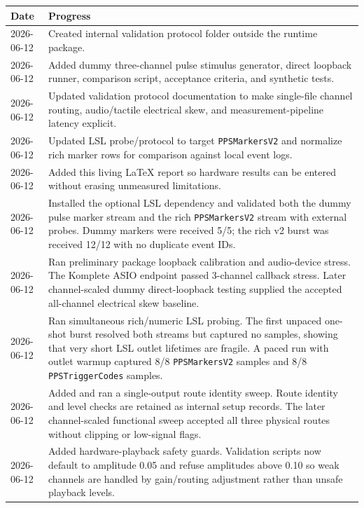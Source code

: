 \documentclass[11pt]{article}
\begin{document}
\begin{longtable}{|p{}|p{}|}
\hline
\textbf{Date} & \textbf{Progress} \\
\hline
2026-06-12 & Created internal validation protocol folder outside the runtime
package. \\
\hline
2026-06-12 & Added dummy three-channel pulse stimulus generator, direct
loopback runner, comparison script, acceptance criteria, and synthetic tests. \\
\hline
2026-06-12 & Updated validation protocol documentation to make single-file
channel routing, audio/tactile electrical skew, and measurement-pipeline
latency explicit. \\
\hline
2026-06-12 & Updated LSL probe/protocol to target \texttt{PPSMarkersV2} and
normalize rich marker rows for comparison against local event logs. \\
\hline
2026-06-12 & Added this living LaTeX report so hardware results can be entered
without erasing unmeasured limitations. \\
\hline
2026-06-12 & Installed the optional LSL dependency and validated both the dummy
pulse marker stream and the rich \texttt{PPSMarkersV2} stream with external
probes. Dummy markers were received 5/5; the rich v2 burst was received 12/12
with no duplicate event IDs. \\
\hline
2026-06-12 & Ran preliminary package loopback calibration and audio-device
stress. The Komplete ASIO endpoint passed 3-channel callback stress. Later
channel-scaled dummy direct-loopback testing supplied the accepted all-channel
electrical skew baseline. \\
\hline
2026-06-12 & Ran simultaneous rich/numeric LSL probing. The first unpaced
one-shot burst resolved both streams but captured no samples, showing that very
short LSL outlet lifetimes are fragile. A paced run with outlet warmup captured
8/8 \texttt{PPSMarkersV2} samples and 8/8 \texttt{PPSTriggerCodes} samples. \\
\hline
2026-06-12 & Added and ran a single-output route identity sweep. Route identity
and level checks are retained as internal setup records. The later
channel-scaled functional sweep accepted all three physical routes without
clipping or low-signal flags. \\
\hline
2026-06-12 & Added hardware-playback safety guards. Validation scripts now
default to amplitude 0.05 and refuse amplitudes above 0.10 so weak channels are
handled by gain/routing adjustment rather than unsafe playback levels. \\

\end{longtable}
\end{document}
